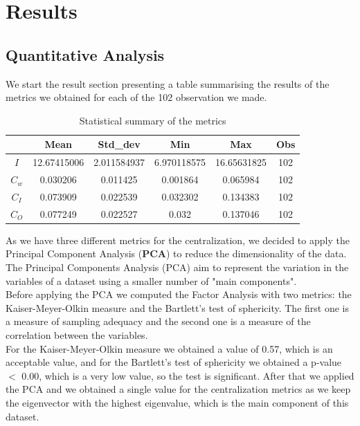 \documentclass[12pt, a4paper]{article}
\begin{document}
\section{Results}
\subsection{Quantitative Analysis}
\label{quantitative-analysis}
We start the result section presenting a table summarising the results of the metrics we obtained for each of the 102 observation we made. \\
\begin{table}[H]
        \centering
        \begin{tabular}{|c|c|c|c|c|c|}
                \hline
                & Mean & Std\_dev & Min & Max & Obs \\
                \hline
                $I$  &  12.67415006 & 2.011584937 & 6.970118575 &16.65631825 &  102 \\
                \hline
                $C_w$  &  0.030206  &  0.011425 & 0.001864 & 0.065984 & 102 \\
                \hline
                $C_I$ & 0.073909 & 0.022539 & 0.032302 & 0.134383 & 102 \\
                \hline
                $C_O$ & 0.077249 & 0.022527 & 0.032 & 0.137046 & 102 \\
                \hline
        \end{tabular}
        \caption{Statistical summary of the metrics}
\end{table}
As we have three different metrics for the centralization, we decided to apply the Principal Component Analysis (\textbf{PCA}) to reduce the dimensionality of the data. The Principal Components Analysis (PCA) aim to represent the variation in the variables of a dataset using a smaller number of "main components".\\
Before applying the PCA we computed the Factor Analysis with two metrics: the Kaiser-Meyer-Olkin measure and the Bartlett's test of sphericity. The first one is a measure of sampling adequacy and the second one is a measure of the correlation between the variables. \\
For the Kaiser-Meyer-Olkin measure we obtained a value of 0.57, which is an acceptable value, and for the Bartlett's test of sphericity we obtained a p-value $<$ 0.00, which is a very low value, so the test is significant.
After that we applied the PCA and we obtained a single value for the centralization metrics as we keep the eigenvector with the highest eigenvalue, which is the main component of this dataset. \\
\end{document}
